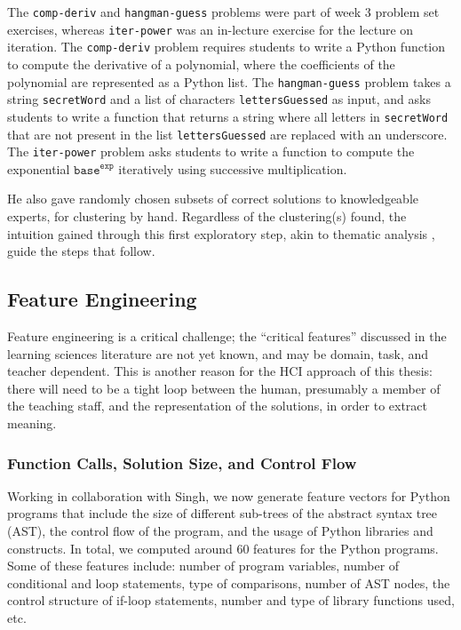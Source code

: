 \documentclass[12pt]{article}
\newcommand\codevar[1]{\texttt{#1}}
\begin{document}
The \codevar{comp-deriv} and \codevar{hangman-guess} problems were part of week 3 problem set exercises, whereas \codevar{iter-power} was an in-lecture exercise for the lecture on iteration. The \codevar{comp-deriv} problem requires students to write a Python function to compute the derivative of a polynomial, where the coefficients of the polynomial are represented as a Python list. The \codevar{hangman-guess} problem takes a string \codevar{secretWord} and a list of characters \codevar{lettersGuessed} as input, and asks students to write a function that returns a string where all letters in \codevar{secretWord} that are not present in the list \codevar{lettersGuessed} are replaced with an underscore. The \codevar{iter-power} problem asks students to write a function to compute the exponential $\codevar{base}^\codevar{exp}$ iteratively using successive multiplication.

He also gave randomly chosen subsets of correct solutions to knowledgeable experts, for clustering by hand. Regardless of the clustering(s) found, the intuition gained through this first exploratory step, akin to thematic analysis \cite{thematic06}, guide the steps that follow.

\subsection{Feature Engineering}

Feature engineering is a critical challenge; the ``critical features'' discussed in the learning sciences literature are not yet known, and may be domain, task, and teacher dependent. This is another reason for the HCI approach of this thesis: there will need to be a tight loop between the human, presumably a member of the teaching staff, and the representation of the solutions, in order to extract meaning.



\subsubsection{Function Calls, Solution Size, and Control Flow}

Working in collaboration with Singh, we now generate feature vectors for Python programs that include the size of different sub-trees of the abstract syntax tree (AST), the control flow of the program, and the usage of Python libraries and constructs. In total, we computed around $60$ features for the Python programs. Some of these features include: number of program variables, number of conditional and loop statements, type of comparisons, number of AST nodes, the control structure of if-loop statements, number and type of library functions used, etc.
\end{document}

